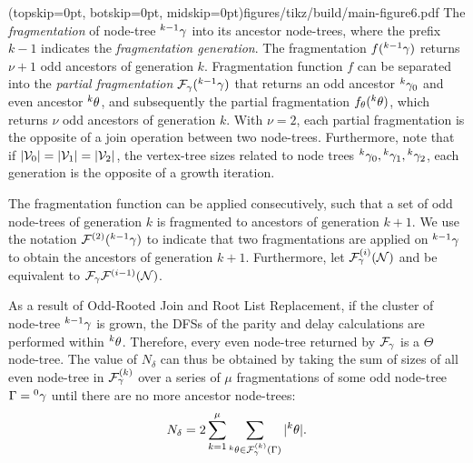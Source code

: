 \Figure[hbt](topskip=0pt, botskip=0pt, midskip=0pt){figures/tikz/build/main-figure6.pdf}{
  The \emph{fragmentation} of node-tree ${}^{k-1}\gamma$ into its ancestor node-trees, where the prefix $k-1$ indicates the \emph{fragmentation generation}. The fragmentation $f({}^{k-1}\gamma)$ returns $\nu+1$ odd ancestors of generation $k$. Fragmentation function $f$ can be separated into the \emph{partial fragmentation} $\mathcal{F}_\gamma({}^{k-1}\gamma)$ that returns an odd ancestor ${}^{k}\gamma_0$ and even ancestor ${}^{k}\theta$, and subsequently the partial fragmentation $f_\theta({}^{k}\theta)$, which returns $\nu$ odd ancestors of generation $k$. With $\nu=2$, each partial fragmentation is the opposite of a join operation between two node-trees. Furthermore, note that if $\lvert\mathcal{V}_0\rvert = \lvert\mathcal{V}_1\rvert = \lvert\mathcal{V}_2\rvert$, the vertex-tree sizes related to node trees ${}^{k}\gamma_0, {}^{k}\gamma_1, {}^{k}\gamma_2$, each generation is the opposite of a growth iteration. \label{fig6}}


The fragmentation function can be applied consecutively, such that a set of odd node-trees of generation $k$ is fragmented to ancestors of generation $k+1$. We use the notation $\mathcal{F}^{(2)}({}^{k-1}\gamma)$ to indicate that two fragmentations are applied on ${}^{k-1}\gamma$ to obtain the ancestors of generation $k+1$. Furthermore, let $\mathcal{F}_\gamma^{(i)}(\mathcal{N})$ and be equivalent to $\mathcal{F}_\gamma \mathcal{F}^{(i-1)}(\mathcal{N})$. 

As a result of Odd-Rooted Join and Root List Replacement, if the cluster of node-tree ${}^{k-1}\gamma$ is grown, the DFSs of the parity and delay calculations are performed within ${}^{k}\theta$. Therefore, every even node-tree returned by $\mathcal{F}_\gamma$ is a $\Theta$ node-tree. The value of $N_\delta$ can thus be obtained by taking the sum of sizes of all even node-tree in $\mathcal{F}_\gamma^{(k)}$ over a series of $\mu$ fragmentations of some odd node-tree $\Gamma = {}^{0}\gamma$ until there are no more ancestor node-trees:
\begin{equation}\label{eq:npdc}
  N_\delta = 2\sum_{k=1}^\mu{ \sum_{  {}^{k} \theta \in \mathcal{F}_\gamma^{(k)}(\Gamma) }{ \lvert {}^{k} \theta\rvert} }.
\end{equation}

